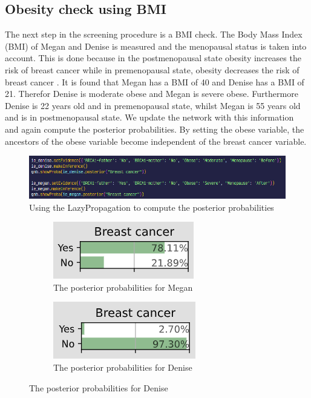 \documentclass{article}
\begin{document}
    \subsection{Obesity check using BMI}
    The next step in the screening procedure is a BMI check. The Body Mass Index (BMI) of Megan and Denise is measured and the menopausal status is taken into account. 
    This is done because in the postmenopausal state obesity increases the risk of breast cancer while in premenopausal state, obesity decreases the risk of breast cancer \cite{garcia2021obesity}.
    It is found that Megan has a BMI of 40 and Denise has a BMI of 21. Therefor Denise is moderate obese and Megan is severe obese. 
    Furthermore Denise is 22 years old and in premenopausal state, whilst Megan is 55 years old and is in postmenopausal state.
    We update the network with this information and again compute the posterior probabilities. By setting the obese variable, the ancestors of the obese variable become independent of the breast cancer variable.
    \begin{figure}[H]
        \centering
        \includegraphics[width=\textwidth]{../figures/inference_obese_menopause_code.png}
        \caption{Using the LazyPropagation to compute the posterior probabilities}
        \label{fig:posterior_2}
    \end{figure}

    \begin{figure}[H]
        \centering
        \begin{subfigure}{.5\textwidth}
          \centering
          \includegraphics[width=.4\linewidth]{../figures/inference_obese_menopause_megan.png}
          \caption{The posterior probabilities for Megan}
          \label{fig:megan_posterior_2}
        \end{subfigure}%
        \begin{subfigure}{.5\textwidth}
          \centering
          \includegraphics[width=.4\linewidth]{../figures/inference_obese_menopause_denise.png}
          \caption{The posterior probabilities for Denise}
          \label{fig:Denise_posterior_2}
        \end{subfigure}
        \label{fig:test}
        \end{figure}
\end{document}
